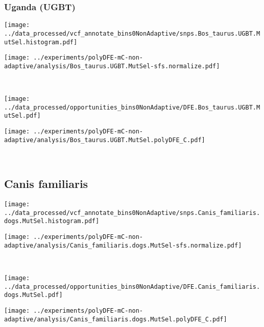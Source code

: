 \subsubsection{Uganda (UGBT)}

\begin{minipage}{0.49\linewidth}
    \texttt{[image: ../data\_processed/vcf\_annotate\_bins0NonAdaptive/snps.Bos\_taurus.UGBT.MutSel.histogram.pdf]}
\end{minipage}
\begin{minipage}{0.49\linewidth}
    \texttt{[image: ../experiments/polyDFE-mC-non-adaptive/analysis/Bos\_taurus.UGBT.MutSel-sfs.normalize.pdf]}
\end{minipage}
\\
\begin{minipage}{0.49\linewidth}
    \texttt{[image: ../data\_processed/opportunities\_bins0NonAdaptive/DFE.Bos\_taurus.UGBT.MutSel.pdf]}
\end{minipage}
\begin{minipage}{0.49\linewidth}
    \texttt{[image: ../experiments/polyDFE-mC-non-adaptive/analysis/Bos\_taurus.UGBT.MutSel.polyDFE\_C.pdf]}
\end{minipage}
\\

\subsection{Canis familiaris}

\begin{minipage}{0.49\linewidth}
    \texttt{[image: ../data\_processed/vcf\_annotate\_bins0NonAdaptive/snps.Canis\_familiaris.dogs.MutSel.histogram.pdf]}
\end{minipage}
\begin{minipage}{0.49\linewidth}
    \texttt{[image: ../experiments/polyDFE-mC-non-adaptive/analysis/Canis\_familiaris.dogs.MutSel-sfs.normalize.pdf]}
\end{minipage}
\\
\begin{minipage}{0.49\linewidth}
    \texttt{[image: ../data\_processed/opportunities\_bins0NonAdaptive/DFE.Canis\_familiaris.dogs.MutSel.pdf]}
\end{minipage}
\begin{minipage}{0.49\linewidth}
    \texttt{[image: ../experiments/polyDFE-mC-non-adaptive/analysis/Canis\_familiaris.dogs.MutSel.polyDFE\_C.pdf]}
\end{minipage}
\\

